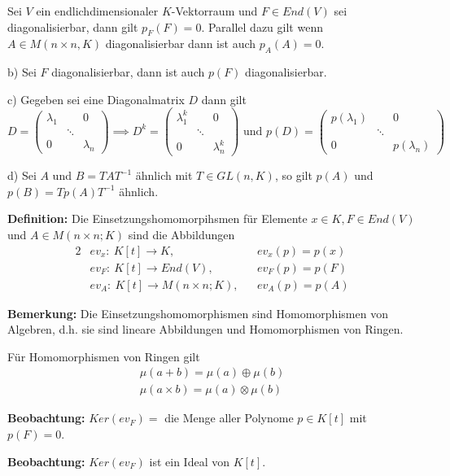 \documentclass{article}
\begin{document}
Sei $V$ ein endlichdimensionaler $K$-Vektorraum und $F\in End(V)$ sei
diagonalisierbar, dann gilt $p_F(F)=0$. Parallel dazu gilt wenn $A\in M(n\times
n, K)$ diagonalisierbar dann ist auch $p_A(A)=0$.

b) Sei $F$ diagonalisierbar, dann ist auch $p(F)$ diagonalisierbar.

c) Gegeben sei eine Diagonalmatrix $D$ dann gilt
\begin{equation*}
	D=\begin{pmatrix}
	\lambda_1 & & 0\\
	& \ddots &\\
		0& & \lambda_n
	\end{pmatrix}
\implies
D^k=\begin{pmatrix}
	\lambda_1^k & & 0\\
	& \ddots &\\
		0& & \lambda_n^k
	\end{pmatrix}
	\text{ und  }
p(D)=\begin{pmatrix}
	p(\lambda_1) & & 0\\
	& \ddots &\\
		0& & p(\lambda_n)
	\end{pmatrix}
\end{equation*}

d) Sei $A$ und $B=TAT^{-1}$ ähnlich mit $T\in GL(n,K)$, so gilt $p(A)$ und
$p(B)=Tp(A)T^{-1}$ ähnlich.

\textbf{Definition:} Die Einsetzungshomomorpihsmen für Elemente $x\in K,F\in
End(V)$ und $A\in M(n\times n; K)$ sind die Abbildungen
\begin{alignat*}{2}
	&ev_x:\ K[t] \to K, \quad && ev_x(p) = p(x)\\
	&ev_F:\ K[t] \to End(V), && ev_F(p) = p(F)\\
	&ev_A:\ K[t] \to M(n\times n;K), && ev_A(p)=p(A)
\end{alignat*}

\textbf{Bemerkung:} Die Einsetzungshomomorphismen sind Homomorphismen von
Algebren, d.h. sie sind lineare Abbildungen und Homomorphismen von Ringen.

Für Homomorphismen von Ringen gilt
\begin{align*}
	\mu(a+b) = \mu(a) \oplus \mu(b)\\
	\mu(a\times b) = \mu(a) \otimes \mu(b)
\end{align*}

\textbf{Beobachtung:} $Ker(ev_F)=$ die Menge aller Polynome $p\in K[t]$ mit
$p(F)=0$.

\textbf{Beobachtung:} $Ker(ev_F)$ ist ein Ideal von $K[t]$.
\end{document}
